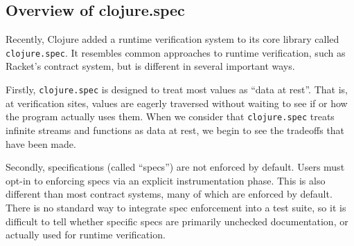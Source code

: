 \documentclass[9pt]{extarticle}
\begin{document}
%
%
%
%
%
%

\subsection{Overview of clojure.spec}

Recently, Clojure added a runtime verification system to its core library called
\texttt{clojure.spec}.
It resembles common approaches to runtime verification, such as Racket's contract
system, but is different in several important ways.

Firstly, \texttt{clojure.spec} is designed to treat most values as ``data at rest''. That is,
at verification sites, values are eagerly traversed without waiting to see
if or how the program actually uses them.
When we consider that \texttt{clojure.spec} treats infinite streams
and functions as data at rest, we begin to see the tradeoffs that have been
made.

Secondly, specifications (called ``specs'') are not enforced by default. Users must
opt-in to enforcing specs via an explicit instrumentation phase.
This is also different than most contract systems, many of which are enforced
by default. There is no standard way to integrate spec enforcement into a
test suite, so it is difficult to tell whether specific specs are primarily 
unchecked documentation, or actually used for runtime verification.
\end{document}
